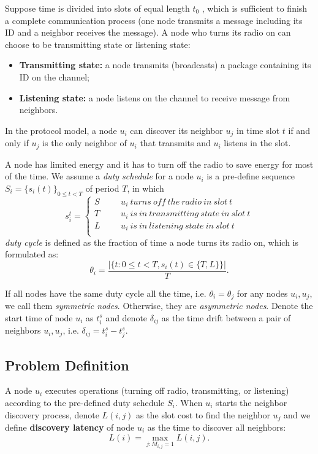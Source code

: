 Suppose time is divided into slots of equal length $t_0$ \cite{van2004lightweight}, which is sufficient to finish a complete communication process (one node transmits a message including its ID and a neighbor receives the message). 
A node who turns its radio on can choose to be transmitting state or listening state:
\begin{itemize}
\item \textbf{Transmitting state:} a node transmits (broadcasts) a package containing its ID on the channel;
\item  \textbf{Listening state:} a node listens on the channel to receive message from neighbors.
\end{itemize}
In the protocol model, a node $u_i$ can discover its neighbor $u_j$ in time slot $t$ if and only if $u_j$ is the only neighbor of $u_i$ that transmits and $u_i$ listens in the slot.

A node has limited energy and it has to turn off the radio to save energy for most of the time. We assume a \emph{duty schedule} for a node $u_i$ is a pre-define sequence $S_i=\{s_i(t)\}_{0\leq t<T}$ of period $T$, in which
$$ s_i^t=\left\{
\begin{aligned}
S  & & & {u_i ~turns~ off~ the~ radio~ in~ slot~ t}  	 \\
T  & & & {u_i ~is~ in~ transmitting~ state~ in~ slot~ t}	\\
L  & & & {u_i ~is~ in~ listening~ state~ in~ slot~ t}	\\
\end{aligned}
\right.
$$
 \emph{duty cycle} is defined as the fraction of time a node turns its radio on, which is formulated as:
$$\theta_i=\frac{|\{t: 0\leq t<T, s_i(t) \in \{T,L\}\}|}{T}.
$$

If all nodes have the same duty cycle all the time, i.e. $\theta_i = \theta_j$ for any nodes $u_i, u_j$, we call them \emph{symmetric nodes}. Otherwise, they are \emph{asymmetric nodes}. Denote the start time of node $u_i$ as $t_i^s$ and denote $\delta_{ij}$ as the time drift between a pair of neighbors $u_i, u_j$, i.e. $\delta_{ij} = t_i^s - t_j^s$.

\subsection{Problem Definition}

A node $u_i$ executes operations (turning off radio, transmitting, or listening) according to the pre-defined duty schedule $S_i$. 
When $u_i$ starts the neighbor discovery process, denote $L(i,j)$ as the slot cost to find the neighbor $u_j$ and we define \textbf{discovery latency} of node $u_i$ as the time to discover all neighbors:
$$L(i) = \max_{j:M_{i,j}=1} L(i,j).
$$


